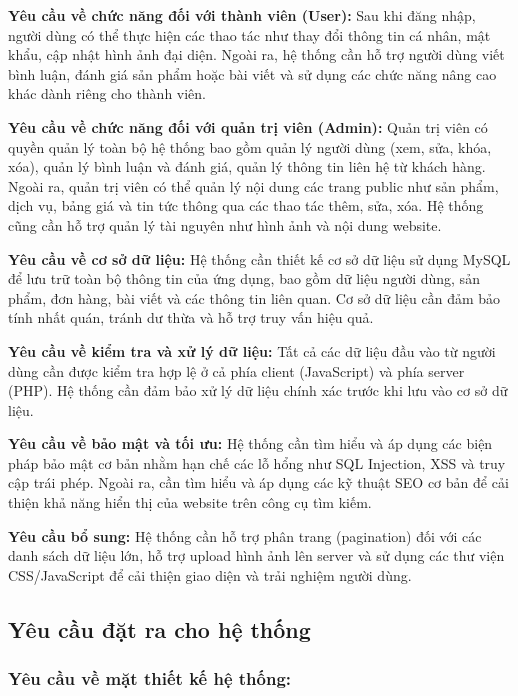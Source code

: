 \documentclass[pt = 12,a4paper]{article}
\begin{document}
\hspace{0.4cm} \textbf{Yêu cầu về chức năng đối với thành viên (User):} Sau khi đăng nhập, người dùng có thể thực hiện các thao tác như thay đổi thông tin cá nhân, mật khẩu, cập nhật hình ảnh đại diện. Ngoài ra, hệ thống cần hỗ trợ người dùng viết bình luận, đánh giá sản phẩm hoặc bài viết và sử dụng các chức năng nâng cao khác dành riêng cho thành viên.

\hspace{0.4cm} \textbf{Yêu cầu về chức năng đối với quản trị viên (Admin):} Quản trị viên có quyền quản lý toàn bộ hệ thống bao gồm quản lý người dùng (xem, sửa, khóa, xóa), quản lý bình luận và đánh giá, quản lý thông tin liên hệ từ khách hàng. Ngoài ra, quản trị viên có thể quản lý nội dung các trang public như sản phẩm, dịch vụ, bảng giá và tin tức thông qua các thao tác thêm, sửa, xóa. Hệ thống cũng cần hỗ trợ quản lý tài nguyên như hình ảnh và nội dung website.

\hspace{0.4cm} \textbf{Yêu cầu về cơ sở dữ liệu:} Hệ thống cần thiết kế cơ sở dữ liệu sử dụng MySQL để lưu trữ toàn bộ thông tin của ứng dụng, bao gồm dữ liệu người dùng, sản phẩm, đơn hàng, bài viết và các thông tin liên quan. Cơ sở dữ liệu cần đảm bảo tính nhất quán, tránh dư thừa và hỗ trợ truy vấn hiệu quả.

\hspace{0.4cm} \textbf{Yêu cầu về kiểm tra và xử lý dữ liệu:} Tất cả các dữ liệu đầu vào từ người dùng cần được kiểm tra hợp lệ ở cả phía client (JavaScript) và phía server (PHP). Hệ thống cần đảm bảo xử lý dữ liệu chính xác trước khi lưu vào cơ sở dữ liệu.

\hspace{0.4cm} \textbf{Yêu cầu về bảo mật và tối ưu:} Hệ thống cần tìm hiểu và áp dụng các biện pháp bảo mật cơ bản nhằm hạn chế các lỗ hổng như SQL Injection, XSS và truy cập trái phép. Ngoài ra, cần tìm hiểu và áp dụng các kỹ thuật SEO cơ bản để cải thiện khả năng hiển thị của website trên công cụ tìm kiếm.

\hspace{0.4cm} \textbf{Yêu cầu bổ sung:} Hệ thống cần hỗ trợ phân trang (pagination) đối với các danh sách dữ liệu lớn, hỗ trợ upload hình ảnh lên server và sử dụng các thư viện CSS/JavaScript để cải thiện giao diện và trải nghiệm người dùng.
\subsection{Yêu cầu đặt ra cho hệ thống}
\subsubsection{Yêu cầu về mặt thiết kế hệ thống:}
\end{document}
